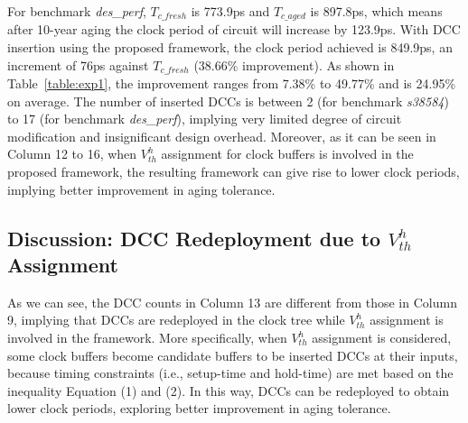 For benchmark \textit{des\_perf}, $T_{c\_fresh}$ is 773.9ps and $T_{c\_aged}$ is 897.8ps, which means after 10-year aging the clock period of circuit will increase by 123.9ps. With DCC insertion using the proposed framework, the clock period achieved is 849.9ps, an increment of 76ps against $T_{c\_fresh}$ (38.66\% improvement). As shown in Table~\ref{table:exp1}, the improvement ranges from 7.38\% to 49.77\% and is 24.95\% on average. \iffalse As shown in Table~\ref{table:exp2}.\fi The number of inserted DCCs is between 2 (for benchmark \textit{s38584}) to 17 (for benchmark \textit{des\_perf}), implying very limited degree of circuit modification and insignificant design overhead. Moreover, as it can be seen in Column 12 to 16, when $V_{th}^h$ assignment for clock buffers is involved in the proposed framework, the resulting framework can give rise to lower clock periods, implying better improvement in aging tolerance. 

\subsection{Discussion: DCC Redeployment due to $V_{th}^h$ Assignment}
As we can see, the DCC counts in Column 13 are different from those in Column 9, implying that DCCs are redeployed in the clock tree while $V_{th}^h$ assignment is involved in the framework. More specifically, when $V_{th}^h$ assignment is considered, some clock buffers become candidate buffers to be inserted DCCs at their inputs, because timing constraints (i.e., setup-time and hold-time) are met based on the inequality Equation (1) and (2). In this way, DCCs can be redeployed to obtain lower clock periods, exploring better improvement in aging tolerance.




